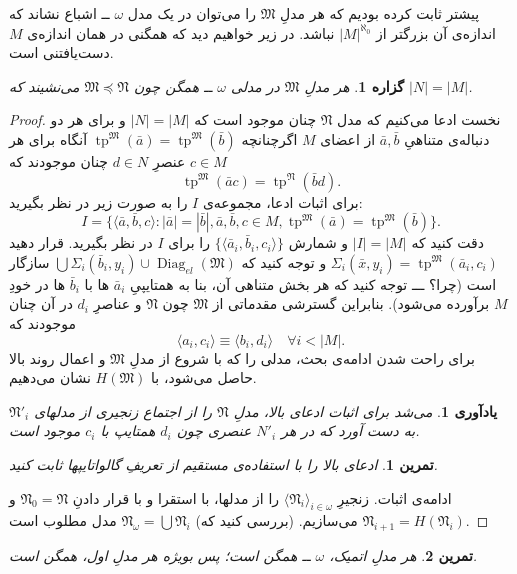 \documentclass[12pt,a4paper]{report}
\theoremstyle{colorhead}
\newtheorem{tam}{تمرین}
\newtheorem{prop}[thm]{گزاره}
\newtheorem{yad}[thm]{یادآوری}
\DeclareMathOperator{\diag}{Diag}
\DeclareMathOperator{\tp}{tp}
\begin{document}
پیشتر ثابت کرده‌ بودیم که هر مدلِ
$\mathfrak{M}$
را می‌توان در یک مدل 
$\omega$ 
ــ
اشباع نشاند که اندازه‌ی آن بزرگتر از
$|M|^{\aleph_0}$
نباشد. در زیر خواهیم دید که همگنی در همان اندازه‌ی
$M$
دست‌یافتنی است.
\begin{prop}
هر مدلِ
$\mathfrak{M}$
در مدلی 
$\omega$
ــ
همگن چون
$\mathfrak{M}\preceq \mathfrak{N}$
می‌نشیند که
$|N|=|M|$.
\end{prop}
\begin{proof}
نخست ادعا می‌کنیم که
مدل
$\mathfrak{N}$
چنان موجود است که
$|N|=|M|$
و برای هر دو دنباله‌ی متناهیِ
$\bar{a},\bar{b}$
از اعضای 
$M$
اگرچنانچه
$\tp^\mathfrak{M}(\bar{a})=\tp^\mathfrak{M}(\bar{b})$
آنگاه برای هر
$c\in M$
عنصرِ
$d\in N$
چنان موجودند که
\[
\tp^\mathfrak{M}(\bar{a}c)=\tp^\mathfrak{N}(\bar{b}d).
\]
برای اثبات ادعا‌، مجموعه‌ی
$I$
را به صورت زیر در نظر بگیرید:
\[
I=\{\langle \bar{a},\bar{b},c\rangle: |\bar{a}|=|\bar{b}|, \bar{a},\bar{b},c\in M,\tp^\mathfrak{M}(\bar{a})=\tp^\mathfrak{M}(\bar{b})\}.
\]
دقت کنید
که
$|I|=|M|$
و شمارش 
$\{\langle\bar{a}_i,\bar{b}_i,c_i\rangle\}$
را برای 
$I$
در نظر بگیرید. قرار دهید
$\Sigma_i(\bar{x},y_i)=\tp^\mathfrak{M}(\bar{a}_i,c_i)$
و توجه کنید که
$\bigcup \Sigma_i(\bar{b}_i,y_i)\cup \diag_{el}(\mathfrak{M})$
سازگار است (چرا؟ ـــ توجه کنید که هر بخش متناهی آن، بنا به 
همتایپیِ
$\bar{a}_i$
ها با
$\bar{b}_i$
ها در خودِ
$M$
برآورده می‌شود). بنابراین
گسترشی مقدماتی از
$\mathfrak{M}$
چون
$\mathfrak{N}$
و عناصرِ
$d_i$
در آن چنان موجودند که 
\[
\langle a_i,c_i\rangle \equiv \langle b_i,d_i\rangle \quad \forall i<|M|.
\]
برای راحت شدن ادامه‌ی بحث،‌
مدلی 
 را که با شروع از مدلِ
$\mathfrak{M}$
و اعمال روند بالا حاصل می‌شود، با 
$H(\mathfrak{M})$
نشان می‌دهیم.
\begin{yad}
می‌شد برای اثبات ادعای بالا، مدلِ
$\mathfrak{N}$
را از اجتماع زنجیری از مدلهای
$\mathfrak{N}'_i$
به دست آورد که در
هر
$N'_i$
عنصری چون
$d_i$
همتایپ با
$c_i$
موجود است.  
\end{yad}
\begin{tam}
ادعای بالا را با استفاده‌ی مستقیم از تعریفِ گالواتایپها
ثابت کنید.
\end{tam}
ادامه‌ی اثبات. زنجیرِ
$\langle \mathfrak{N}_i\rangle_{i\in \omega}$
را از مدلها، با استقرا و با قرار دادنِ
\mbox{$\mathfrak{N}_0=\mathfrak{N}$}
و 
\mbox{$\mathfrak{N}_{i+1}=H(\mathfrak{N}_i)$}
می‌سازیم. (بررسی کنید که)
\mbox{$\mathfrak{N}_\omega=\bigcup \mathfrak{N}_i$}
مدل مطلوب است.
\end{proof}
\begin{tam}
هر مدلِ
اتمیک،
$\omega$
ــ
همگن است؛ پس بویژه هر مدلِ اول، همگن است.
\end{tam}
\end{document}
